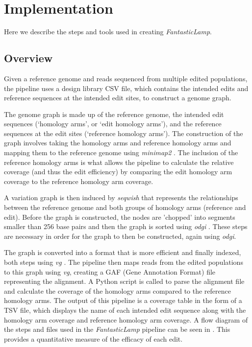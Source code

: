 \documentclass{bioinfo}
\theoremstyle{definition}
\begin{document}
\section{Implementation}
\label{sec:implementation}
Here we describe the steps and tools used in creating \textit{FantasticLamp}. 
\subsection{Overview}


Given a reference genome and reads sequenced from multiple edited populations, the pipeline uses a design library CSV file, which contains the intended edits and reference sequences at the intended edit sites, to construct a genome graph.

The genome graph is made up of the reference genome, the intended edit sequences (`homology arms', or `edit homology arms'), and the reference sequences at the edit sites (`reference homology arms').
The construction of the graph involves taking the homology arms and reference homology arms and mapping them to the reference genome using \textit{minimap2} \citep{li2018minimap2}.
The inclusion of the reference homology arms is what allows the pipeline to calculate the relative coverage (and thus the edit efficiency) by comparing the edit homology arm coverage to the reference homology arm coverage.

A variation graph is then induced by \textit{seqwish} \citep{garrison2023unbiased} that represents the relationships between the reference genome and both groups of homology arms (reference and edit).
Before the graph is constructed, the nodes are 'chopped' into segments smaller than 256 base pairs and then the graph is sorted using \textit{odgi} \citep{guarracino2022odgi}.
These steps are necessary in order for the graph to then be constructed, again using \textit{odgi}. 

The graph is converted into a format that is more efficient and finally indexed, both steps using \textit{vg} \citep{garrison2018variation}.
The pipeline then maps reads from the edited populations to this graph using \textit{vg}, creating a GAF (Gene Annotation Format) file representing the alignment.
A Python script is called to parse the alignment file and calculate the coverage of the homology arms compared to the reference homology arms.
The output of this pipeline is a coverage table in the form of a TSV file, which displays the name of each intended edit sequence along with the homology arm coverage and reference homology arm coverage.
A flow diagram of the steps and files used in the \textit{FantasticLamp} pipeline can be seen in .  
This provides a quantitative measure of the efficacy of each edit. 
\end{document}
